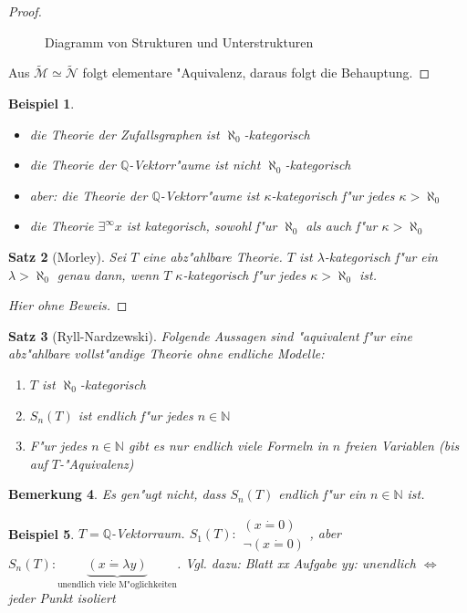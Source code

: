 \documentclass[a4paper,12pt,numbers=noenddot,parskip=full]{scrartcl}
\newcommand{\setN}{\mathbb{N}}
\newcommand{\setQ}{\mathbb{Q}}
\newcommand{\scrM}{\mathcal{M}}
\newcommand{\scrN}{\mathcal{N}}
\theoremstyle{dotless}
\newtheorem{theorem}{Satz}[section]
\newtheorem{example}[theorem]{Beispiel}
\newtheorem{remark}[theorem]{Bemerkung}
\begin{document}
\begin{proof}
\begin{figure}
\begin{tikzpicture}[x=0.75pt,y=0.75pt,yscale=-1,xscale=1]
	
	\end{tikzpicture}
	\caption{Diagramm von Strukturen und Unterstrukturen}
	\label{im:strukturen}
	\end{figure}
	Aus $\tilde{\scrM} \simeq \tilde{\scrN}$ folgt elementare "Aquivalenz, daraus folgt die Behauptung.
\end{proof}
\begin{example}
	\begin{itemize}
		\item die Theorie der Zufallsgraphen ist $\aleph_0$-kategorisch
		\item die Theorie der $\setQ$-Vektorr"aume ist nicht $\aleph_0$-kategorisch
		\item aber: die Theorie der $\setQ$-Vektorr"aume ist $\kappa$-kategorisch f"ur jedes $\kappa > \aleph_0$
		\item die Theorie $\exists^\infty x$ ist kategorisch, sowohl f"ur $\aleph_0$ als auch f"ur $\kappa>\aleph_0$
	\end{itemize}
\end{example}
\begin{theorem}[Morley]
	Sei $T$ eine abz"ahlbare Theorie. $T$ ist $\lambda$-kategorisch f"ur ein $\lambda > \aleph_0$ genau dann, wenn $T$ $\kappa$-kategorisch f"ur jedes $\kappa>\aleph_0$ ist.
\end{theorem}
\begin{proof}[Hier ohne Beweis]
\end{proof}
\begin{theorem}[Ryll-Nardzewski]\label{rn}
	Folgende Aussagen sind "aquivalent f"ur eine abz"ahlbare vollst"andige Theorie ohne endliche Modelle:
	\begin{enumerate}[label=(\alph*)]
		\item $T$ ist $\aleph_0$-kategorisch
		\item $S_n (T)$ ist endlich f"ur jedes $n \in \setN$
		\item F"ur jedes $n \in \setN$ gibt es nur endlich viele Formeln in $n$ freien Variablen (bis auf $T$-"Aquivalenz)
	\end{enumerate}
\end{theorem}
\begin{remark}
	Es gen"ugt nicht, dass $S_n (T)$ endlich f"ur \emph{ein} $n \in \setN$ ist.
\end{remark}
\begin{example}
	$T = \setQ$-Vektorraum. $S_1 (T): \begin{array}{r}
		(x \dot=0)\\
		\lnot(x \dot= 0)
	\end{array}$, aber $S_n (T): \underbrace{(x \dot= \lambda y)}_{\text{unendlich viele M"oglichkeiten}}$. Vgl. dazu: %
	Blatt xx Aufgabe yy: unendlich $\Leftrightarrow$ jeder Punkt isoliert
\end{example}
\end{document}
